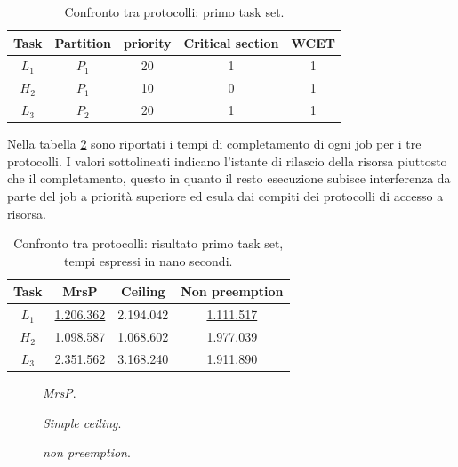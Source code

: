 \begin{table}
  \centering
  \begin{tabular}{ccccc}
	\hline\hline
	    Task & Partition & priority & Critical section & WCET  \\ \hline
	    $L_1$ & $P_1$  & 20 & 1 & 1 \\
	    $H_2$ & $P_1$  & 10 & 0 & 1 \\
    	$L_3$ & $P_2$  & 20 & 1 & 1 \\
  	\hline
  	\end{tabular}
  \caption{Confronto tra protocolli: primo task set.}
  \label{tab:test_protocols_Taskset1}
\end{table}

\noindent Nella tabella \ref{tab:test_protocols_Taskset1_ris} sono riportati i tempi di completamento di ogni job per i tre protocolli. I valori sottolineati indicano l'istante di rilascio della risorsa piuttosto che il completamento, questo in quanto il resto esecuzione subisce interferenza da parte del job a priorità superiore ed esula dai compiti dei protocolli di accesso a risorsa.\\

\begin{table}
  \centering
  \begin{tabular}{cccc}
  \hline\hline
    Task & MrsP & Ceiling & Non preemption \\ \hline
    $L_1$ & \underline{1.206.362} & 2.194.042 & \underline{1.111.517} \\
    $H_2$ & 1.098.587 & 1.068.602 & 1.977.039 \\
    $L_3$ & 2.351.562 & 3.168.240 & 1.911.890 \\
    \hline
    \end{tabular}
  \caption{Confronto tra protocolli: risultato primo task set, tempi espressi in nano secondi.}
  \label{tab:test_protocols_Taskset1_ris}
\end{table}

    \begin{figure}
      \centering
      \RisultatoUnoMrsP
      \caption{\textit{MrsP}.}
      \label{fig:test_protocols_mrsp}
    \end{figure}

    \begin{figure}
      \centering
      \RisultatoUnoCeiling
      \caption{\textit{Simple ceiling}.}
      \label{fig:test_protocols_sc}
    \end{figure}
    
    \begin{figure}
      \centering
      \RisultatoUnoNoPreempion
      \caption{\textit{non preemption}.}
      \label{fig:test_protocols_np}
    \end{figure}

